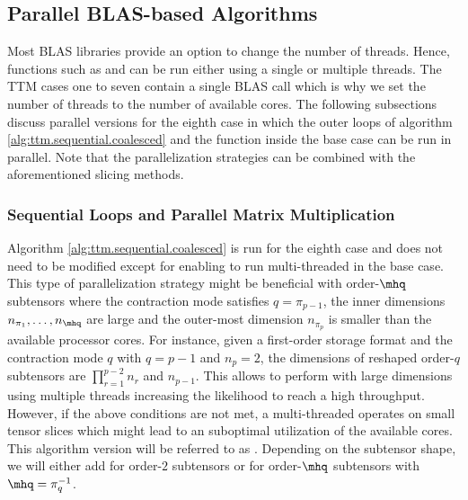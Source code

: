 



 
\subsection{Parallel BLAS-based Algorithms}
\label{subsec:parallel.multi-loops}
Most BLAS libraries provide an option to change the number of threads.
Hence, functions such as  and  can be run either using a single or multiple threads.
The TTM cases one to seven contain a single BLAS call which is why we set the number of threads to the number of available cores.
The following subsections discuss parallel versions for the eighth case in which the outer loops of algorithm \ref{alg:ttm.sequential.coalesced} and the  function inside the base case can be run in parallel.
Note that the parallelization strategies can be combined with the aforementioned slicing methods.

\subsubsection{Sequential Loops and Parallel Matrix Multiplication}
Algorithm \ref{alg:ttm.sequential.coalesced} is run for the eighth case and does not need to be modified except for  enabling  to run multi-threaded in the base case.
This type of parallelization strategy might be beneficial with order-$\mhq$ subtensors where the contraction mode satisfies $q = \pi_{p-1}$, the inner dimensions $n_{\pi_1},\dots,n_{\mhq}$ are large and the outer-most dimension $n_{\pi_{p}}$ is smaller than the available processor cores.
For instance, given a first-order storage format and the contraction mode $q$ with $q=p-1$ and $n_p=2$, the dimensions of reshaped order-$q$ subtensors are $\prod_{r=1}^{p-2}n_r$ and $n_{p-1}$.
This allows  to perform with large dimensions using multiple threads increasing the likelihood to reach a high throughput.
However, if the above conditions are not met, a multi-threaded  operates on small tensor slices which might lead to an suboptimal utilization of the available cores.
This algorithm version will be referred to as .
Depending on the subtensor shape, we will either add  for order-$2$ subtensors or  for order-$\mhq$ subtensors with $\mhq = \pi^{-1}_q$.

